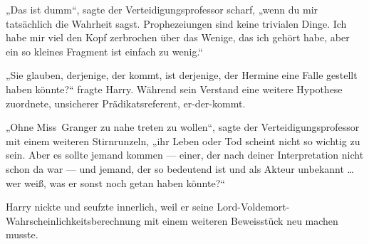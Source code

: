 „Das ist dumm“, sagte der Verteidigungsprofessor scharf, „wenn du mir tatsächlich die Wahrheit sagst. Prophezeiungen sind keine trivialen Dinge. Ich habe mir viel den Kopf zerbrochen über das Wenige, das ich gehört habe, aber ein so kleines Fragment ist einfach zu wenig.“

„Sie glauben, derjenige, der kommt, ist derjenige, der Hermine eine Falle gestellt haben könnte?“ fragte Harry. Während sein Verstand eine weitere Hypothese zuordnete, unsicherer Prädikatsreferent, er-der-kommt.

„Ohne Miss~Granger zu nahe treten zu wollen“, sagte der Verteidigungsprofessor mit einem weiteren Stirnrunzeln, „ihr Leben oder Tod scheint nicht so wichtig zu sein. Aber es sollte jemand kommen — einer, der nach deiner Interpretation nicht schon da war — und jemand, der so bedeutend ist und als Akteur unbekannt … wer weiß, was er sonst noch getan haben könnte?“

Harry nickte und seufzte innerlich, weil er seine Lord-Voldemort-Wahrscheinlichkeitsberechnung mit einem weiteren Beweisstück neu machen musste.

